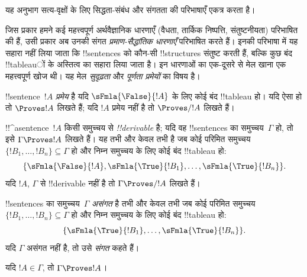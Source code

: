 \documentclass[../../../include/open-logic-section]{subfiles}
\begin{document}
      {}
      {}
      

\begin{editorial}
यह अनुभाग सत्य-वृक्षों के लिए सिद्धता-संबंध और संगतता की परिभाषाएँ एकत्र
करता है।
\end{editorial}

\begin{explain}
जिस प्रकार हमने कई महत्त्वपूर्ण अर्थवैज्ञानिक धारणाएँ (वैधता, तार्किक
निष्पत्ति, संतुष्टनीयता) परिभाषित की हैं, उसी प्रकार अब उनकी संगत
\emph{प्रमाण-सैद्धांतिक धारणाएँ} परिभाषित करते हैं। इनकी परिभाषा में यह
सहारा नहीं लिया जाता कि !!{sentence}s को कौन-सी !!{structure}s संतुष्ट करती
हैं, बल्कि कुछ बंद !!{tableau}ों के अस्तित्व का सहारा लिया जाता है। इन
धारणाओं का एक-दूसरे से मेल खाना एक महत्त्वपूर्ण खोज थी। यह मेल
\emph{सुदृढ़ता} और \emph{पूर्णता प्रमेयों} का विषय है।
\end{explain}


\begin{defn}[प्रमेय]
!!{sentence}~$!A$ \emph{प्रमेय} है यदि
$\sFmla{\False}{!A}$ के लिए कोई बंद !!{tableau} हो। यदि ऐसा हो तो
$\Proves !A$ लिखते हैं; यदि $!A$ प्रमेय नहीं है तो $\Proves/ !A$ लिखते हैं।
\end{defn}

\begin{defn}[!!^{derivability}]
!!^a{sentence}~$!A$ किसी समुच्चय से \emph{!!{derivable}} है; यदि वह
!!{sentence}s का समुच्चय~$\Gamma$ हो, तो इसे $\Gamma \Proves !A$ लिखते हैं।
यह तभी और केवल तभी है जब कोई परिमित समुच्चय
$\{!B_1, \dots, !B_n\} \subseteq \Gamma$ हो और निम्न समुच्चय के लिए कोई
बंद !!{tableau} हो:
\[
\{
  \sFmla{\False}{!A},
  \sFmla{\True}{!B_1}, \dots,
  \sFmla{\True}{!B_n}
  \}.
\]
यदि $!A$, $\Gamma$ से !!{derivable} नहीं है तो $\Gamma \Proves/
!A$ लिखते हैं।
\end{defn}

\begin{defn}[संगतता]
!!{sentence}s का समुच्चय~$\Gamma$ \emph{असंगत} है तभी और केवल तभी जब कोई
परिमित समुच्चय $\{!B_1, \dots, !B_n\} \subseteq \Gamma$ हो और निम्न
समुच्चय के लिए कोई बंद !!{tableau} हो:
\[
\{
  \sFmla{\True}{!B_1}, \dots,
  \sFmla{\True}{!B_n}  
  \}.
\]
यदि $\Gamma$ असंगत नहीं है, तो उसे \emph{संगत} कहते हैं।
\end{defn}

\begin{prop}[स्वतुल्यता]
यदि $!A \in \Gamma$, तो $\Gamma \Proves !A$।
\end{prop}
\end{document}
